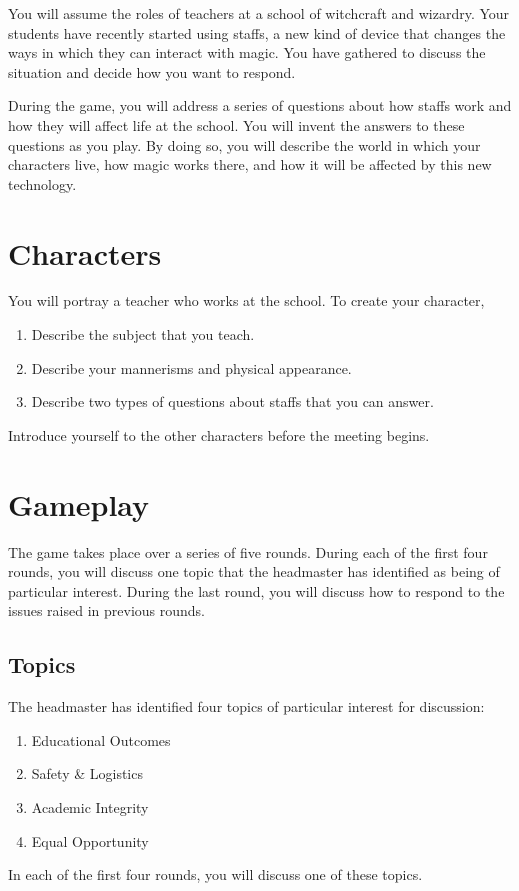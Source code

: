 \documentclass[a6paper, 11pt, parskip=half]{scrartcl}
\begin{document}
You will assume the roles of teachers at a school of witchcraft and wizardry. Your students have recently started using staffs, a new kind of device that changes the ways in which they can interact with magic. You have gathered to discuss the situation and decide how you want to respond.

During the game, you will address a series of questions about how staffs work and how they will affect life at the school. You will invent the answers to these questions as you play. By doing so, you will describe the world in which your characters live, how magic works there, and how it will be affected by this new technology.

\newpage

\section*{Characters}
You will portray a teacher who works at the school. To create your character,
\begin{enumerate}[nosep]
	\item Describe the subject that you teach.
	\item Describe your mannerisms and physical appearance.
	\item Describe two types of questions about staffs that you can answer.
\end{enumerate}
Introduce yourself to the other characters before the meeting begins.

\section*{Gameplay}
The game takes place over a series of five rounds. 
During each of the first four rounds, you will discuss one topic that the headmaster has identified as being of particular interest.
During the last round, you will discuss how to respond to the issues raised in previous rounds. 

\newpage

\subsection*{Topics}
The headmaster has identified four topics of particular interest for discussion:
\begin{enumerate}[nosep]
	\item Educational Outcomes
	\item Safety \& Logistics
	\item Academic Integrity
	\item Equal Opportunity
\end{enumerate}
In each of the first four rounds, you will discuss one of these topics.
\end{document}
